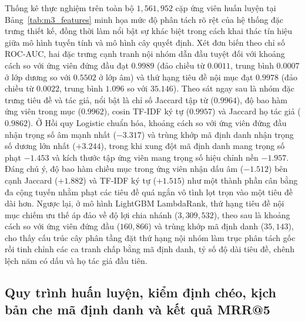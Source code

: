 Thống kê thực nghiệm trên toàn bộ $1{,}561{,}952$ cặp ứng viên huấn luyện tại Bảng~\ref{tab:m3_features} minh họa mức độ phân tách rõ rệt của hệ thống đặc trưng thiết kế, đồng thời làm nổi bật sự khác biệt trong cách khai thác tín hiệu giữa mô hình tuyến tính và mô hình cây quyết định. Xét đơn biến theo chỉ số ROC-AUC, hai đặc trưng cạnh tranh nội nhóm dẫn đầu tuyệt đối với khoảng cách so với ứng viên đứng đầu đạt $0.9989$ (đảo chiều từ $0.0011$, trung bình $0.0007$ ở lớp dương so với $0.5502$ ở lớp âm) và thứ hạng tiêu đề nội mục đạt $0.9978$ (đảo chiều từ $0.0022$, trung bình $1.096$ so với $35.146$). Theo sát ngay sau là nhóm đặc trưng tiêu đề và tác giả, nổi bật là chỉ số Jaccard tập từ ($0.9964$), độ bao hàm ứng viên trong mục ($0.9962$), cosin TF-IDF ký tự ($0.9957$) và Jaccard họ tác giả ($0.9862$). Ở Hồi quy Logistic chuẩn hóa, khoảng cách so với ứng viên đứng đầu nhận trọng số âm mạnh nhất ($-3.317$) và trùng khớp mã định danh nhận trọng số dương lớn nhất ($+3.244$), trong khi xung đột mã định danh mang trọng số phạt $-1.453$ và kích thước tập ứng viên mang trọng số hiệu chỉnh nền $-1.957$. Đáng chú ý, độ bao hàm chiều mục trong ứng viên nhận dấu âm ($-1.512$) bên cạnh Jaccard ($+1.882$) và TF-IDF ký tự ($+1.515$) như một thành phần cân bằng đa cộng tuyến nhằm phạt các tiêu đề quá ngắn vô tình lọt trọn vào một tiêu đề dài hơn. Ngược lại, ở mô hình LightGBM LambdaRank, thứ hạng tiêu đề nội mục chiếm ưu thế áp đảo về độ lợi chia nhánh ($3{,}309{,}532$), theo sau là khoảng cách so với ứng viên đứng đầu ($160{,}866$) và trùng khớp mã định danh ($35{,}143$), cho thấy cấu trúc cây phân tầng đặt thứ hạng nội nhóm làm trục phân tách gốc rồi tinh chỉnh các ca tranh chấp bằng mã định danh, tỷ số độ dài tiêu đề, chênh lệch năm có dấu và họ tác giả đầu tiên.

\subsection{Quy trình huấn luyện, kiểm định chéo, kịch bản che mã định danh và kết quả MRR@5}

